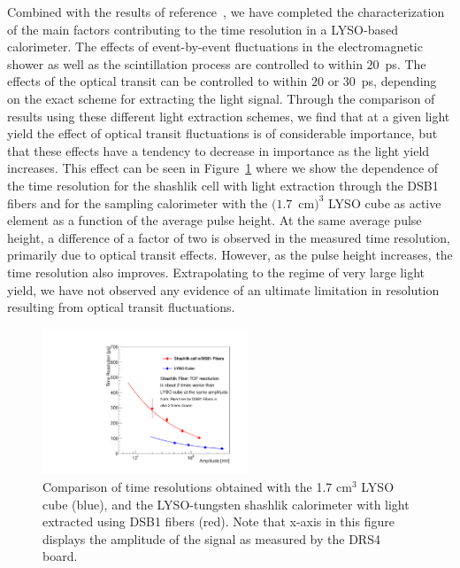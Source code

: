 \documentclass[12pt]{article}
\begin{document}
Combined with the results of reference~\cite{MCPFastCaloNIMA}, we 
have completed the characterization of the main factors
contributing to the time  resolution in a LYSO-based
calorimeter. The effects of event-by-event fluctuations in
the electromagnetic shower as well as the scintillation process 
are controlled to within $20$~ps. The effects of the optical transit
can be controlled to within $20$ or $30$~ps, depending on the
exact scheme for extracting the light signal. Through the comparison of results
using these different light extraction schemes, we find that at a 
given light yield the effect of optical transit fluctuations
is of considerable importance, but that these effects
have a tendency to decrease in importance as the light yield
increases. This effect can be seen in 
Figure~\ref{fig:ShashlikFiberAndCubeTOF} where we show
the dependence of the time resolution
for the shashlik cell with light extraction through the
DSB1 fibers and for the sampling calorimeter with the
$(1.7$~cm$)^{3}$ LYSO cube as active element as a function
of the average pulse height. At the same average pulse height,
a difference of a factor of two is observed in the
measured time  resolution, primarily due to
optical transit effects. However, as the pulse height
increases, the time  resolution also improves.
Extrapolating to the regime of very large light yield,
we have not observed any evidence of an
ultimate limitation in resolution resulting from
optical transit fluctuations.

\begin{figure}[H] \centering
\includegraphics[width=0.55\textwidth]{figs/TimeResolutionVsEnergy_ShashlikDSB1FiberAndCube} 
\caption{Comparison of time resolutions obtained with the 1.7 cm$^3$ LYSO cube (blue), and the LYSO-tungsten shashlik calorimeter with light extracted using DSB1 fibers (red). Note that x-axis in this figure displays the amplitude of the signal as measured by the DRS4 board.} 
\label{fig:ShashlikFiberAndCubeTOF}
\end{figure}
\end{document}
